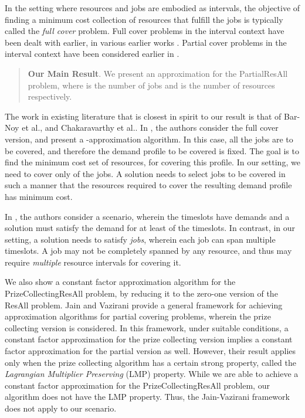 \documentclass[11pt]{article}
\newcommand{\ResAll} {{\sc ResAll}}
\newcommand{\PResAll}{{\sc PartialResAll}}
\newcommand{\PCResAll}{{\sc PrizeCollectingResAll}}
\begin{document}
In the setting where resources and jobs are embodied as intervals, the objective of finding a minimum cost collection of
resources that fulfill the jobs is typically called the {\em full cover} problem. Full cover problems in the interval context have 
been dealt with earlier, in various earlier works \cite{Bar-Noy,bhatia07,cgk10}. Partial cover 
problems in the interval context have been considered earlier in \cite{esa2011}.
\begin{quote}
{\bf Our Main Result}.
We present an  approximation for the {\PResAll} problem, where
 is the number of jobs and  is the number of resources respectively.
\end{quote}
The work in existing literature that is closest in spirit to our result is that of
Bar-Noy et al.\cite{Bar-Noy}, and Chakaravarthy et al.\cite{esa2011}.
In \cite{Bar-Noy}, the authors consider the full cover version, and present 
a -approximation algorithm. In this case, all the jobs are to be covered, 
and therefore the demand profile to be covered is fixed. The goal is to find the 
minimum cost set of resources, for covering this profile. 
In our setting, 
we need to cover only  of the jobs. 
A solution needs to select  jobs to be covered in such a manner 
that  the resources required to cover the resulting demand profile has minimum cost.  

In \cite{esa2011}, the authors consider a scenario, wherein the 
timeslots have demands and a solution must satisfy the demand for at least  of the timeslots. 
In contrast, in our setting, a solution needs to satisfy  {\em jobs}, wherein 
each job can span multiple timeslots. 
A job may not be completely spanned by any resource, and thus may require
{\em multiple} resource intervals for covering it.  

We also show a constant factor approximation algorithm for the {\PCResAll} problem, by reducing it 
to the zero-one version of the {\ResAll} problem. 
Jain and Vazirani \cite{JV01} provide a general framework for achieving approximation algorithms for partial 
covering problems, wherein the prize collecting version is considered. In this framework, under suitable conditions, 
a constant factor approximation for the prize collecting version implies a constant factor approximation
for the partial version as well. However, their result applies only when the prize collecting algorithm has a
 certain strong property, called the {\em Lagrangian Multiplier Preserving} (LMP) property. 
While we are able to achieve a constant factor approximation for the {\PCResAll} problem, 
our algorithm does not have the LMP property. Thus, the Jain-Vazirani framework does not apply 
to our scenario. 
\end{document}
